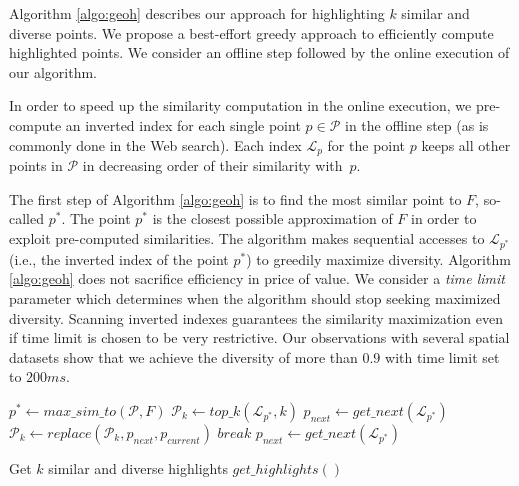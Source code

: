 \documentclass[sigconf,edbt]{acmart-edbt2019}
\begin{document}
Algorithm \ref{algo:geoh} describes our approach for highlighting $k$ similar and diverse points.
We propose a best-effort greedy approach to efficiently compute highlighted points. We consider an offline step followed by the online execution of our algorithm.

\vspace{2pt}
In order to speed up the similarity computation in the online execution, we pre-compute an inverted index for each single point $p \in {\mathcal P}$ in the offline step (as is commonly done in the Web search). Each index ${\mathcal L}_p$ for the point $p$ keeps all other points in ${\mathcal P}$ in decreasing order of their similarity with~$p$.

\vspace{2pt}
The first step of Algorithm \ref{algo:geoh} is to find the most similar point to $F$, so-called $p^*$. The point $p^*$ is the closest possible approximation of $F$ in order to exploit pre-computed similarities. The algorithm makes sequential accesses to ${\mathcal L}_{p^*}$ (i.e., the inverted index of the point $p^*$) to greedily maximize diversity. Algorithm \ref{algo:geoh} does not sacrifice efficiency in price of value. We consider a {\em time limit} parameter which determines when the algorithm should stop seeking maximized diversity. Scanning inverted indexes guarantees the similarity maximization even if time limit is chosen to be very restrictive. Our observations with several spatial datasets show that we achieve the diversity of more than $0.9$ with time limit set to $200ms$.


\begin{algorithm}[t]
\DontPrintSemicolon
{}
$p^* \gets \mathit{max\_sim\_to}(\mathcal{P},F)$\;
$\mathcal{P}_k \gets \mathit{top\_k}(\mathit{{\mathcal L}_{p^*}},k)$\label{ln:topk}\;
$p_{next} \gets get\_next(\mathit{{\mathcal L}_{p^*}})$\;\label{cd:getnext}
       {\label{cd:beginwhile}
              {
                     {\label{cd:betterdiv}
                     ${\mathcal P}_k \gets \mathit{replace}({\mathcal P}_k,p_{next},p_{current})$\;
                            $break$\;
                     }
              }
              $p_{next} \gets get\_next(\mathit{{\mathcal L}_{p^*}})$\;}\label{cd:endwhile}
       \; 
       \caption{Get $k$ similar and diverse highlights $\mathit{get\_highlights}()$}
       \label{algo:geoh}
\end{algorithm}
\end{document}
